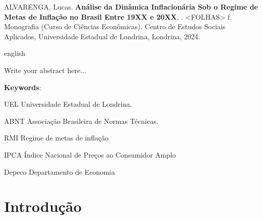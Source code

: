 \documentclass[12pt,oneside,a4paper,chapter=TITLE,english,brazil,sumario=abnt-6027-2012]{abntex2}
\begin{document}
\noindent
ALVARENGA, Lucas. {\bfseries Análise da Dinâmica Inflacionária Sob o Regime de Metas de Inflação no Brasil Entre 19XX e 20XX}, \imprimirdata. <FOLHAS> f. Monografia (Curso de Ciências Econômicas). Centro de Estudos Sociais Aplicados, Universidade Estadual de Londrina, Londrina, 2024.

\begin{resumo}[Abstract]
	\begin{otherlanguage*}{english}
		
		Write your abstract here... 
		
		\vspace{\onelineskip}
		
		\noindent 
		\textbf{Keywords}: 
	\end{otherlanguage*}
\end{resumo}
\pagebreak


\listoffigures*
\cleardoublepage


\listoftables*
\cleardoublepage


\begin{siglas}
	\item[UEL] Universidade Estadual de Londrina. 
	\item[ABNT] Associação Brasileira de Normas Técnicas.
	\item[RMI] Regime de metas de inflação
	\item[IPCA] Índice Nacional de Preços ao Consumidor Amplo
\end{siglas}
\pagebreak


\begin{simbolos}
	\item[Depeco] Departamento de Economia
\end{simbolos}
\pagebreak


\tableofcontents*
\cleardoublepage


\textual %
\pagestyle{simple}

\chapter{Introdução}
\end{document}
